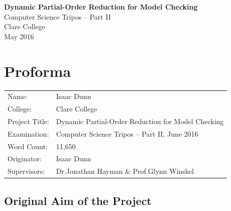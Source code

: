 \documentclass[12pt,a4paper,twoside,openany]{report}
\begin{document}




\thispagestyle{empty}


\vspace*{60mm}
\begin{center}
\Huge
\textbf{Dynamic Partial-Order Reduction for Model Checking} \\[7mm]
Computer Science Tripos -- Part II \\[6mm]
Clare College \\[7mm]
\LARGE May 2016  %
\end{center}


\newpage
\null
\thispagestyle{empty}


\pagestyle{plain}

\chapter*{Proforma}

{\large
\begin{tabular}{ll}
Name:           &  Isaac Dunn                            			 \\
College:        &  Clare College                    				     \\
Project Title:	&  Dynamic Partial-Order Reduction for Model Checking \\
Examination:    &  Computer Science Tripos -- Part II, June 2016      \\
Word Count:     &  11,650\footnotemark[1]					 \\
Originator: &  Isaac Dunn\footnotemark[2] 					 \\
Supervisors:	&  Dr.\@ Jonathan Hayman \& Prof.\@ Glynn Winskel         \\
\end{tabular}
}


\section*{Original Aim of the Project}
\end{document}
